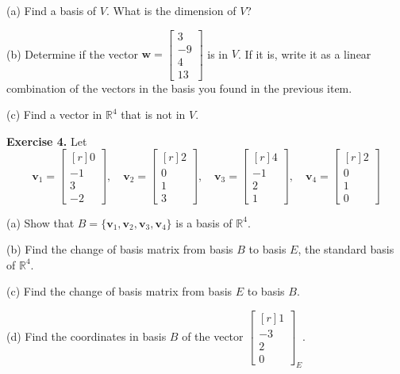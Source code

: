 \documentclass[12pt]{article}
\begin{document}
\medskip
(a) Find a basis of $V$. What is the dimension of $V$?

\medskip
(b) Determine if the vector $\mathbf{w}=\left[\begin{matrix}3\\-9\\4\\13\end{matrix}\right]$ is in $V$. If it is, write it as a linear combination of the vectors in the basis you found in the previous item.

\medskip
(c) Find a vector in $\mathbb{R}^4$ that is not in $V$.

\bigskip
\textbf{Exercise 4.} Let
\[
\mathbf{v}_1=\left[\begin{matrix*}[r]0\\-1\\3\\-2\end{matrix*}\right],\quad
\mathbf{v}_2=\left[\begin{matrix*}[r]2\\0\\1\\3\end{matrix*}\right],\quad
\mathbf{v}_3=\left[\begin{matrix*}[r]4\\-1\\2\\1\end{matrix*}\right],\quad
\mathbf{v}_4=\left[\begin{matrix*}[r]2\\0\\1\\0\end{matrix*}\right]
\]

\medskip
(a) Show that $B=\{\mathbf{v}_1,\mathbf{v}_2,\mathbf{v}_3,\mathbf{v}_4\}$ is a basis of $\mathbb{R}^4$.

\medskip
(b) Find the change of basis matrix from basis $B$ to basis $E$, the standard basis of $\mathbb{R}^4$. 

\medskip
(c) Find the change of basis matrix from basis $E$ to basis $B$.

\medskip
(d) Find the coordinates in basis $B$ of the vector
$\begin{bmatrix*}[r]1\\-3\\2\\0\end{bmatrix*}_E$. 
\end{document}
